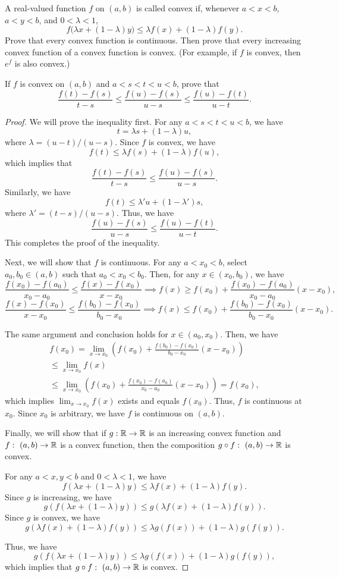 \documentclass{article}
\begin{document}
\begin{problem}[4-23]
A real-valued function $f$ on $(a,b)$ is called convex if, whenever $a<x<b$, $a<y<b$, and $0<\lambda<1$,
\[
f\bigl(\lambda x+(1-\lambda)y\bigr)\le \lambda f(x)+(1-\lambda)f(y).
\]
Prove that every convex function is continuous. Then prove that every increasing convex function of a convex function is convex. (For example, if $f$ is convex, then $e^f$ is also convex.)

If $f$ is convex on $(a,b)$ and $a<s<t<u<b$, prove that
\[
\frac{f(t)-f(s)}{t-s}\le \frac{f(u)-f(s)}{u-s}\le \frac{f(u)-f(t)}{u-t}.
\]
\end{problem}

\begin{proof}
  We will prove the inequality first. For any \( a<s<t<u<b \), we have
  \[ t=\lambda s+(1-\lambda)u, \]
  where \( \lambda=(u-t)/(u-s) \). Since \( f \) is convex, we have
  \[ f(t)\le \lambda f(s)+(1-\lambda)f(u), \]
  which implies that
  \[ \frac{f(t)-f(s)}{t-s}\le \frac{f(u)-f(s)}{u-s}. \]
  Similarly, we have
  \[ f(t)\le \lambda' u+(1-\lambda')s, \]
  where \( \lambda'=(t-s)/(u-s) \). Thus, we have
  \[ \frac{f(u)-f(s)}{u-s}\le \frac{f(u)-f(t)}{u-t}. \]
  This completes the proof of the inequality.\par
  Next, we will show that \( f \) is continuous. For any \( a<x_0<b \), select \( a_0,b_0 \in (a,b) \) such that \( a_0<x_0<b_0 \). Then, for any \( x\in(x_0,b_0) \), we have
  \[ \frac{f(x_0)-f(a_0)}{x_0-a_0}\le \frac{f(x)-f(x_0)}{x-x_0}\implies f(x)\ge f(x_0)+\frac{f(x_0)-f(a_0)}{x_0-a_0}(x-x_0), \]
  \[ \frac{f(x)-f(x_0)}{x-x_0}\le \frac{f(b_0)-f(x_0)}{b_0-x_0}\implies f(x)\le f(x_0)+\frac{f(b_0)-f(x_0)}{b_0-x_0}(x-x_0). \]\par
  The same argument and conclusion holds for \( x\in(a_0,x_0) \). Then, we have
  \begin{multline*}
    f(x_0)=\lim_{x\to x_0}\left( f(x_0)+\frac{f(b_0)-f(x_0)}{b_0-x_0}(x-x_0) \right)\\
    \le\lim_{x\to x_0}f(x)\\
    \le\lim_{x\to x_0} \left( f(x_0)+\frac{f(x_0)-f(a_0)}{x_0-a_0}(x-x_0) \right)=f(x_0),
  \end{multline*}
  which implies \( \lim_{x\to x_0}f(x) \) exists and equals \( f(x_0) \). Thus, \( f \) is continuous at \( x_0 \). Since \( x_0 \) is arbitrary, we have \( f \) is continuous on \( (a,b) \).\par
  Finally, we will show that if \( g:\mathbb{R}\to\mathbb{R} \) is an increasing convex function and \( f:\ (a,b)\to\mathbb{R} \) is a convex function, then the composition \( g\circ f:\ (a,b)\to\R \) is convex.\par
  For any \( a<x,y<b \) and \( 0<\lambda<1 \), we have
  \[ f(\lambda x+(1-\lambda)y)\le \lambda f(x)+(1-\lambda)f(y). \]
  Since \( g \) is increasing, we have
  \[ g(f(\lambda x+(1-\lambda)y))\le g(\lambda f(x)+(1-\lambda)f(y)). \]
  Since \( g \) is convex, we have
  \[ g(\lambda f(x)+(1-\lambda  )f(y))\le \lambda g(f(x))+(1-\lambda)g(f(y)). \]\par
  Thus, we have
  \[ g(f(\lambda x+(1-\lambda)y))\le \lambda g(f(x))+(1-\lambda)g(f(y)), \]
  which implies that \( g\circ f:\ (a,b)\to\R \) is convex.
\end{proof}
\end{document}
